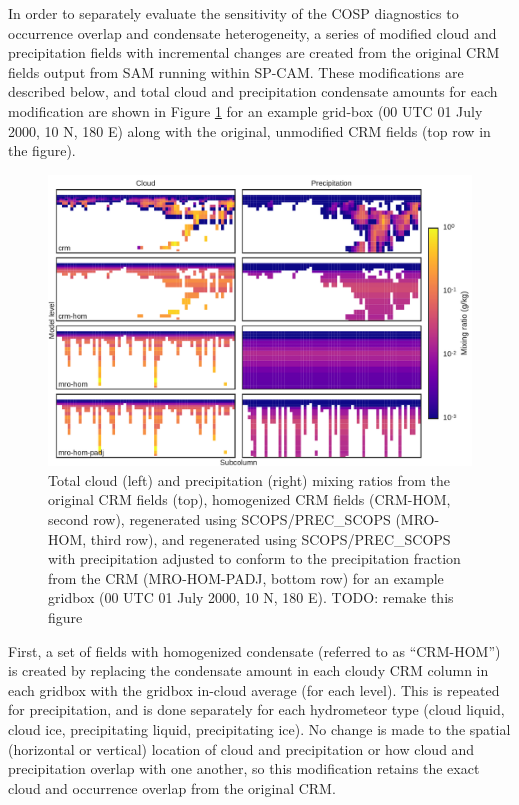 In order to separately evaluate the sensitivity of the COSP diagnostics to occurrence overlap and condensate heterogeneity, a series of modified cloud and precipitation fields with incremental changes are created from the original CRM fields output from SAM running within SP-CAM. These modifications are described below, and total cloud and precipitation condensate amounts for each modification are shown in Figure \ref{subgrid1_mxratio_example} for an example grid-box (00 UTC 01 July 2000, 10 N, 180 E) along with the original, unmodified CRM fields (top row in the figure).

\begin{figure}
    \centering
    \includegraphics[width=\columnwidth]{graphics/subgrid1_mxratio_example.pdf}
    \caption{Total cloud (left) and precipitation (right) mixing ratios from the original CRM fields (top), homogenized CRM fields (CRM-HOM, second row), regenerated using SCOPS/PREC\_SCOPS (MRO-HOM, third row), and regenerated using SCOPS/PREC\_SCOPS with precipitation adjusted to conform to the precipitation fraction from the CRM (MRO-HOM-PADJ, bottom row) for an example gridbox (00 UTC 01 July 2000, 10 N, 180 E). TODO: remake this figure}
    \label{subgrid1_mxratio_example} 
\end{figure}

First, a set of fields with homogenized condensate (referred to as ``CRM-HOM'') is created by replacing the condensate amount in each cloudy CRM column in each gridbox with the gridbox in-cloud average (for each level). This is repeated for precipitation, and is done separately for each hydrometeor type (cloud liquid, cloud ice, precipitating liquid, precipitating ice). No change is made to the spatial (horizontal or vertical) location of cloud and precipitation or how cloud and precipitation overlap with one another, so this modification retains the exact cloud and occurrence overlap from the original CRM.

